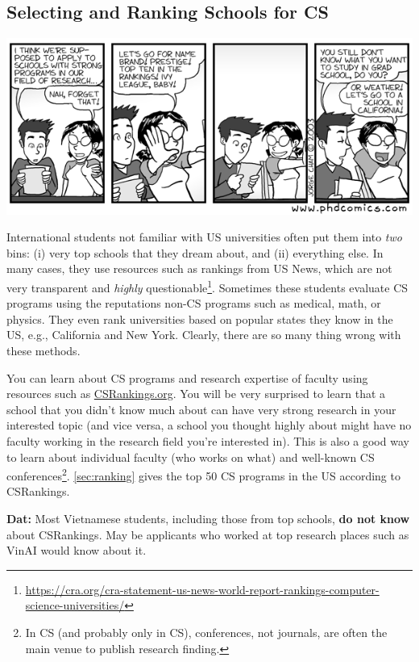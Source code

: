 \documentclass[oneside,11pt]{memoir}
\newenvironment{commentbox}[1][]{
  \small
  \begin{mybox}
    {\small \textbf{#1}}
  }{
  \end{mybox}
}
\begin{document}
\subsection{Selecting and Ranking Schools for CS}\label{sec:selecting-ranking-schools}
\begin{center}
  \includegraphics[scale=0.5]{files/c1.png}
\end{center}

International students not familiar with US universities often put them into \emph{two} bins:  (i) very top schools that they dream about, and (ii) everything else.  In many cases, they use resources such as rankings from US News, which are not very transparent and \emph{highly} questionable\footnote{\url{https://cra.org/cra-statement-us-news-world-report-rankings-computer-science-universities/}}.  Sometimes these students evaluate CS programs using the reputations non-CS programs such as medical, math, or physics.
They even rank universities based on popular states they know in the US, e.g., California and New York.  Clearly, there are so many thing wrong with these methods. 

You can learn about CS programs and research expertise of faculty using resources such as \href{https://csrankings.org}{CSRankings.org}. You will be very surprised to learn that a school that you didn't know much about can have very strong research in your interested topic (and vice versa, a school you thought highly about might have no faculty working in the research field you're interested in). This is also a good way to learn about individual faculty (who works on what) and well-known CS conferences\footnote{In CS (and probably only in CS), conferences, not journals, are often the main venue to publish research finding.}. \autoref{sec:ranking} gives the top 50 CS programs in the US according to CSRankings.

\begin{commentbox}[Dat:] Most Vietnamese students, including those from top schools, \textbf{do not know} about CSRankings.  May be applicants who worked at top research places such as VinAI would know about it.
\end{commentbox}
\end{document}
